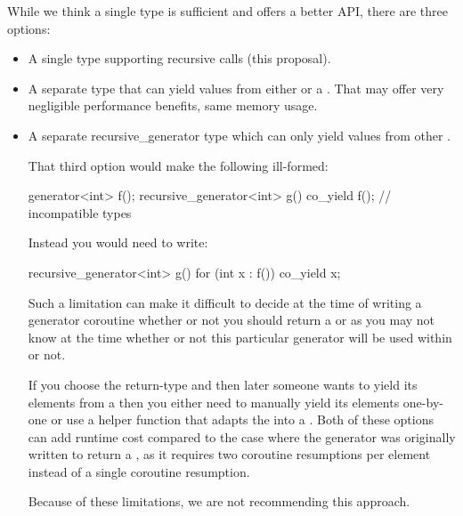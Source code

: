 \documentclass{wg21}
\begin{document}
While we think a single  type is sufficient and offers a better API, there are three options:

\begin{itemize}
    \item A single  type supporting recursive calls (this proposal).
    
    \item A separate type  that can yield values from either  or a . That may offer very negligible performance benefits, same memory usage.
    
    \item A separate {recursive_generator} type which can only yield values from other . 
    
    That third option would make the following ill-formed:
    
    \begin{colorblock}
        generator<int> f();
        recursive_generator<int> g() {
            co_yield f(); // incompatible types
        }
    \end{colorblock}
    
    Instead you would need to write:
    \begin{colorblock}
        recursive_generator<int> g() {
            for (int x : f()) co_yield x;
        }
    \end{colorblock}
    
    Such a limitation can make it difficult to decide at the time of writing a generator
    coroutine whether or not you should return a  or 
    as you may not know at the time whether or not this particular generator will be used
    within  or not.
    
    If you choose the  return-type and then later someone wants to yield its
    elements from a  then you either need to manually yield its
    elements one-by-one or use a helper function that adapts the  into a
    . Both of these options can add runtime cost compared to the case where the generator was originally written to return a ,
    as it requires two coroutine resumptions per element instead of a single coroutine resumption.
    
    Because of these limitations, we are not recommending this approach.
\end{itemize}
\end{document}
